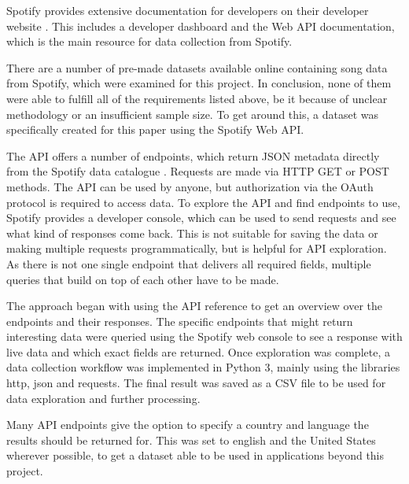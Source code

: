 Spotify provides extensive documentation for developers on their developer website \cite{SpotifyDev}.
This includes a developer dashboard and the Web API documentation, which is the main resource
for data collection from Spotify.

There are a number of pre-made datasets available online containing song data from Spotify,
which were examined for this project. In conclusion, none of them were able to fulfill
all of the requirements listed above, be it because of unclear methodology or an insufficient sample size.
To get around this, a dataset was specifically created for this paper using the Spotify Web API.

The \ac{API} offers a number of endpoints, which return \ac{JSON} metadata
directly from the Spotify data catalogue \cite{SpotifyWebAPI}.
Requests are made via HTTP GET or POST methods.
The \ac{API} can be used by anyone, but authorization via the OAuth protocol is required to access data.
To explore the \ac{API} and find endpoints to use, Spotify provides a developer console, which can be used to 
send requests and see what kind of responses come back. This is not suitable for saving the data or making multiple
requests programmatically, but is helpful for API exploration. As there is not one single endpoint that delivers all
required fields, multiple queries that build on top of each other have to be made.

The approach began with using the \ac{API} reference to get an overview over the endpoints and their responses.
The specific endpoints that might return interesting data were queried using the Spotify web console to see
a response with live data and which exact fields are returned.
Once exploration was complete, a data collection workflow was implemented in Python 3, mainly using the
libraries http, json and requests. The final result was saved as a CSV file to be used for data exploration
and further processing.

Many API endpoints give the option to specify a country and language the results should be returned for.
This was set to english and the United States wherever possible, to get a dataset able to be used
in applications beyond this project.


